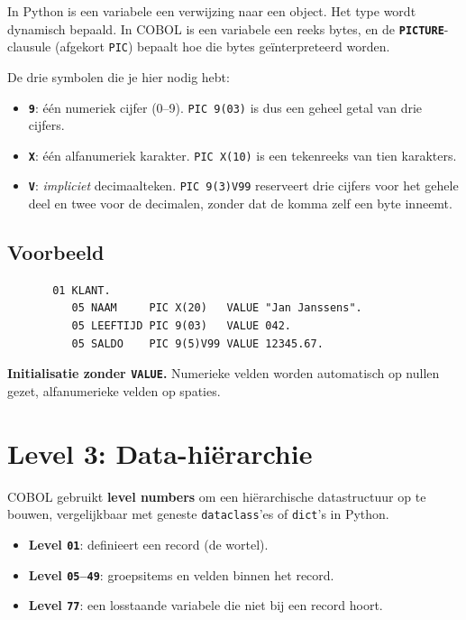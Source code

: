 \documentclass[11pt,a4paper]{article}
\begin{document}
In Python is een variabele een verwijzing naar een object. Het type wordt dynamisch bepaald. 
In COBOL is een variabele een reeks bytes, en de \textbf{\texttt{PICTURE}}-clausule (afgekort \texttt{PIC}) bepaalt hoe die bytes geïnterpreteerd worden.

De drie symbolen die je hier nodig hebt:

\begin{itemize}
    \item \textbf{\texttt{9}}: één numeriek cijfer (0--9). \texttt{PIC 9(03)} is dus een geheel getal van drie cijfers.
    \item \textbf{\texttt{X}}: één alfanumeriek karakter. \texttt{PIC X(10)} is een tekenreeks van tien karakters.
    \item \textbf{\texttt{V}}: \emph{impliciet} decimaalteken. \texttt{PIC 9(3)V99} reserveert drie cijfers voor het gehele deel en twee voor de decimalen, zonder dat de komma zelf een byte inneemt.
\end{itemize}

\subsection*{Voorbeeld}
\begin{lstlisting}
       01 KLANT.
          05 NAAM     PIC X(20)   VALUE "Jan Janssens".
          05 LEEFTIJD PIC 9(03)   VALUE 042.
          05 SALDO    PIC 9(5)V99 VALUE 12345.67.
\end{lstlisting}

\textbf{Initialisatie zonder \texttt{VALUE}.} Numerieke velden worden automatisch op nullen gezet, alfanumerieke velden op spaties.

\section{Level 3: Data-hiërarchie}

COBOL gebruikt \textbf{level numbers} om een hiërarchische datastructuur op te bouwen, vergelijkbaar met geneste \texttt{dataclass}'es of \texttt{dict}'s in Python.

\begin{itemize}
    \item \textbf{Level \texttt{01}}: definieert een record (de wortel).
    \item \textbf{Level \texttt{05}--\texttt{49}}: groepsitems en velden binnen het record.
    \item \textbf{Level \texttt{77}}: een losstaande variabele die niet bij een record hoort.
\end{itemize}
\end{document}
